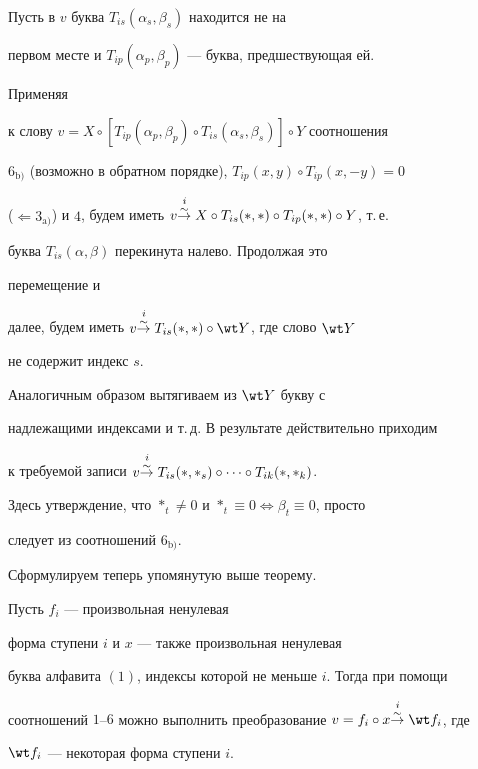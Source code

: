 \begin{pf} 


Пусть в $v$ буква $T_{is}(\alpha_s,\beta_s)$ находится не на 


первом месте и $T_{ip}(\alpha_p,\beta_p)$ --- буква, предшествующая ей. 


Применяя 


к слову $v=X\circ[T_{ip}(\alpha_p,\beta_p)\circ 


T_{is}(\alpha_s,\beta_s)]\circ Y$ соотношения 


$6_{\mathrm b)}$ (возможно в обратном порядке), $T_{ip}(x,y)\circ 


T_{ip}(x,-y)=0$ 


($\Leftarrow 3_{\mathrm a)}$) и $4$, будем иметь $v\isimto X\circ 


T_{is}(*,*)\circ T_{ip}(*,*)\circ Y$, т.\,е. 


буква $T_{is}(\alpha,\beta)$ перекинута налево. Продолжая это 


перемещение и 


далее, будем иметь $v\isimto T_{is}(*,*)\circ \wt Y$, где слово $\wt Y$ 


не содержит индекс $s$. 


Аналогичным образом вытягиваем из $\wt Y$ букву с 


надлежащими индексами и т.\,д. В результате действительно приходим 


к требуемой записи $v\isimto T_{is}(*,*_s)\circ\dotsb\circ 


T_{ik}(*,*_k)$. 


Здесь утверждение, что $*_t\ne0$ и $*_t\equiv 0\Leftrightarrow 


\beta_t\equiv0$, просто 


следует из соотношений $6_{\mathrm b)}$. 


\end{pf} 


 


Сформулируем теперь упомянутую выше теорему. 


 


\begin{thm} 


Пусть $f_i$ --- произвольная ненулевая 


форма ступени $i$ и $x$ --- также произвольная ненулевая 


буква алфавита $(1)$, индексы которой не меньше $i$. Тогда при помощи 


соотношений $1$--$6$ можно выполнить преобразование $v=f_i\circ 


x\isimto\wt f_i$, где 


$\wt f_i$ --- некоторая форма ступени $i$. 


\end{thm} 


